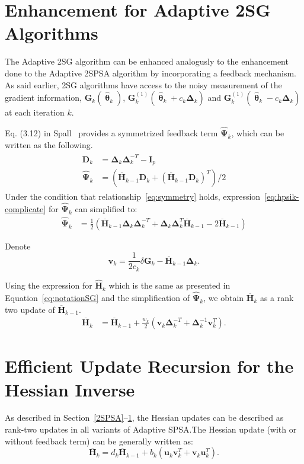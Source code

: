 \documentclass[conference]{IEEEtran}
\newcommand{\bD}{\bm{D}}
\newcommand{\bG}{\bm{G}}
\newcommand{\bI}{\bm{I}}
\newcommand{\bDelta}{\bm{\Delta}}
\newcommand{\oH}{\bm{\overline{H}}}
\newcommand{\hH}{\bm{\hat{H}}}
\newcommand{\hPsi}{\bm{\hat{\Psi}}}
\newcommand{\htheta}{\bm{\hat{\uptheta}}}
\begin{document}
\section{Enhancement for Adaptive 2SG Algorithms}
 \label{Enhanced 2SG}
 The Adaptive 2SG algorithm can be enhanced analogusly to the enhancement done
 to the Adaptive 2SPSA algorithm by incorporating a feedback
 mechanism. As said earlier, 2SG algorithms have access
 to the noisy measurement of the gradient information,
 $\bG_k(\htheta_k)$, $\bG_k^{(1)}(\htheta_k+ c_k\bDelta_k)$ and
 $\bG_k^{(1)}(\htheta_k- c_k\bDelta_k)$ at each iteration $k$.

Eq. (3.12) in Spall~\cite{Spall2009} provides a symmetrized
feedback term $ \hPsi_k $, which can be written as the following.
\begin{align}
  \begin{split}
    \bD_k &= \bDelta_k\bDelta_k^{-T}-\bI_p \\
    \hPsi_k &=(\oH_{k-1}\bD_k + (\oH_{k-1}\bD_k)^T)/2 \label{eq:hpsik-complicate}
  \end{split}
\end{align}
Under the condition that relationship~\ref{eq:symmetry} holds,
expression~\ref{eq:hpsik-complicate} for $\hPsi_k$ can simplified to:
\begin{align}
  \hPsi_k &=\frac{1}{2}\left( \oH_{k-1}\bDelta_k\bDelta_k^{-T}+\bDelta_k\bDelta_k^{T}\oH_{k-1}-2\oH_{k-1} \right)
\end{align}

Denote
\begin{equation}
\bm{v}_k= \frac{1}{2c_k}\delta\bG_k-\oH_{k-1}\bDelta_k.
\end{equation}

Using the expression for $\hH_k$ which is the same as presented in
Equation~\ref{eq:notationSG} and the simplification of $\hPsi_k$, we
obtain $\oH_k$ as a rank two update of $\oH_{k-1}$.
\begin{align*}
 \oH_k&=\oH_{k-1}+\frac{w_k}{2} (\bm{v}_k\bDelta_k^{-T}+\bDelta_k^{-1}\bm{v}_k^{T}).
\end{align*}

\section{Efficient Update Recursion for the Hessian Inverse}
As described in Section~\ref{2SPSA}--\ref{Enhanced 2SG}, the
Hessian updates can be described as rank-two updates in all
variants of Adaptive SPSA.\@ The Hessian update (with or without
feedback term) can be generally written as:
\begin{equation}
\label{eq:CoherentRecursion}
  \oH_{k}=d_k\oH_{k-1}+b_k(\bm{u}_k \bm{v}_k^{T}+\bm{v}_k \bm{u}_k^{T}).
\end{equation}
\end{document}
